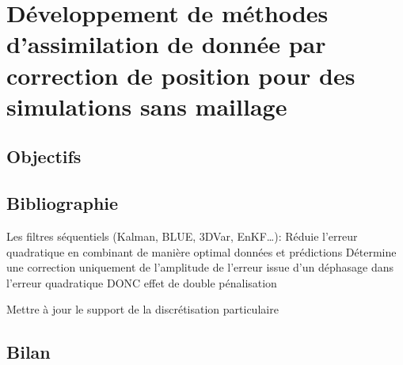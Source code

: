 
\chapter{Développement de méthodes d'assimilation de donnée par correction de position pour des simulations sans maillage}

\section{Objectifs}

\section{Bibliographie}
Les filtres séquentiels (Kalman, BLUE, 3DVar, EnKF…):
Réduie l’erreur quadratique en combinant de manière optimal données et prédictions
Détermine une correction uniquement de l’amplitude
de l’erreur issue d’un déphasage dans l’erreur quadratique DONC effet de double pénalisation

Mettre à jour le support de la discrétisation particulaire


\section{Bilan}